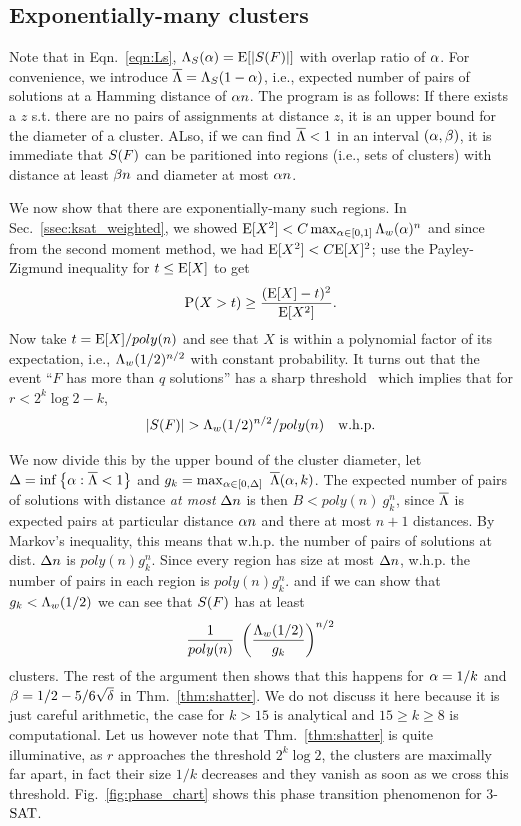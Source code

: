 \documentclass[letterpaper, 10pt, twocolumn, reqno]{amsart}
\begin{document}
\subsection{Exponentially-many clusters}
\label{ssec:exp_many_clusters}
Note that in Eqn.~\eqref{eqn:Ls}, $\L_S(\a) = \E[\abs{\sf}]$ with overlap ratio of $\a$. For convenience, we introduce $\bL = \L_S(1-\a)$, i.e., expected number of pairs of solutions at a Hamming distance of $\a n$. The program is as follows: If there exists a $z$ s.t. there are no pairs of assignments at distance $z$, it is an upper bound for the diameter of a cluster. ALso, if we can find $\bL <1$ in an interval $(\a, \b)$, it is immediate that $\sf$ can be paritioned into regions (i.e., sets of clusters) with distance at least $\b n$ and diameter at most $\a n$.

We now show that there are exponentially-many such regions. In Sec.~\ref{ssec:ksat_weighted}, we showed $\E[X^2] < C \max_{\a \in [0,1]} \L_w(\a)^n$ and since from the second moment method, we had $\E[X^2] < C \E[X]^2$; use the Payley-Zigmund inequality for $t \leq \E[X]$ to get
$$
\P(X > t) \geq \f{(\E[X]-t)^2}{\E[X^2]}.
$$
Now take $t = \E[X]/poly(n)$ and see that $X$ is within a polynomial factor of its expectation, i.e., $\L_w(1/2)^{n/2}$ with constant probability. It turns out that the event ``$F$ has more than $q$ solutions'' has a sharp threshold~\cite{achlioptas2008algorithmic} which implies that for $r < 2^k \log 2 - k$,
$$\abs{\sf} > \L_w(1/2)^{n/2}/poly(n) \quad \trm{w.h.p.}$$

We now divide this by the upper bound of the cluster diameter, let $\D = \inf \cbrac{\a: \bL < 1}$ and $g_k = \max_{\a \in [0,\D]}\ \bL(\a,k)$. The expected number of pairs of solutions with distance \emph{at most} $\D n$ is then $B < poly(n)\ g_k^n$, since $\bL$ is expected pairs at particular distance $\a n$ and there at most $n+1$ distances. By Markov's inequality, this means that w.h.p. the number of pairs of solutions at dist. $\D n$ is $poly(n) g_k^n$. Since every region has size at most $\D n$, w.h.p. the number of pairs in each region is $poly(n) g_k^n$. and if we can show that $g_k < \L_w(1/2)$ we can see that $\sf$ has at least
$$
\f{1}{poly(n)}\ \rbrac{\f{\L_w(1/2)}{g_k}}^{n/2}
$$
clusters. The rest of the argument then shows that this happens for $\a = 1/k$ and $\b = 1/2 - 5/6\sqrt{\d}$ in Thm.~\ref{thm:shatter}. We do not discuss it here because it is just careful arithmetic, the case for $k > 15$ is analytical and $15 \geq k \geq 8$ is computational. Let us however note that Thm.~\ref{thm:shatter} is quite illuminative, as $r$ approaches the threshold $2^k \log 2$, the clusters are maximally far apart, in fact their size $1/k$ decreases and they vanish as soon as we cross this threshold. Fig.~\ref{fig:phase_chart} shows this phase transition phenomenon for 3-$\SAT$.
\end{document}
